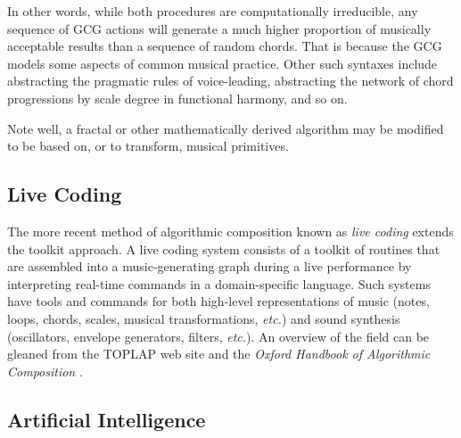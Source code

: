 \documentclass[11pt,papersize=a4]{scrartcl}
\begin{document}
In other words, while both procedures are computationally irreducible, any sequence of GCG actions will generate a much higher proportion of musically acceptable results than a sequence of random chords. That is because the GCG models some aspects of common musical practice. Other such syntaxes include abstracting the pragmatic rules of voice-leading, abstracting the network of chord progressions by scale degree in functional harmony, and so on.

Note well, a fractal or other mathematically derived algorithm may be modified to be based on, or to transform, musical primitives.

\subsection*{Live Coding}

The more recent method of algorithmic composition known as \emph{live coding} extends the toolkit approach. A live coding system consists of a toolkit of routines that are assembled into a music-generating graph during a live performance by interpreting real-time commands in a domain-specific language. Such systems have tools and commands for both high-level representations of music (notes, loops, chords, scales, musical transformations, \emph{etc.}) and sound synthesis (oscillators, envelope generators, filters, \emph{etc.}). An overview of the field can be gleaned from the TOPLAP web site \parencite{toplap} and the \emph{Oxford Handbook of Algorithmic Composition} \parencite{mclean2018oxford}.

\subsection*{Artificial Intelligence}
\end{document}
